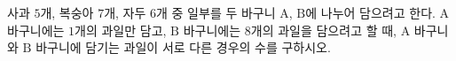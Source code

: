 \hspace*{2mm}\begin{minipage}[t]{\dimexpr\linewidth-2mm\relax}\vspace{0pt}
사과 $5$개, 복숭아 $7$개, 자두 $6$개 중 일부를 두 바구니 $\mathrm{A}$, $\mathrm{B}$에 나누어 담으려고 한다. $\mathrm{A}$ 바구니에는 $1$개의 과일만 담고, $\mathrm{B}$ 바구니에는 $8$개의 과일을 담으려고 할 때, $\mathrm{A}$ 바구니와 $\mathrm{B}$ 바구니에 담기는 과일이 서로 다른 경우의 수를 구하시오. \end{minipage}
